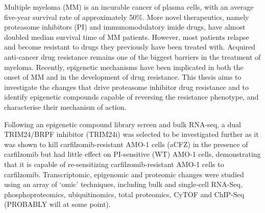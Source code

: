 
Multiple myeloma (MM) is an incurable cancer of plasma cells, with an average five-year survival rate of approximately 50\%.
More novel therapeutics, namely proteasome inhibitors (PI) and immunomodulatory imide drugs, have almost doubled median survival time of MM patients.
However, most patients relapse and become resistant to drugs they previously have been treated with.
Acquired anti-cancer drug resistance remains one of the biggest barriers in the treatment of myeloma.
Recently, epigenetic mechanisms have been implicated in both the onset of MM and in the development of drug resistance.
This thesis aims to investigate the changes that drive proteasome inhibitor drug resistance and to identify epigenetic compounds capable of reversing the resistance phenotype, and characterise their mechanism of action.

Following an epigenetic compound library screen and bulk RNA-seq, a dual TRIM24/BRPF inhibitor (TRIM24i) was selected to be investigated further as it was shown to kill carfilzomib-resistant AMO-1 cells (aCFZ) in the presence of carfilzomib but had little effect on PI-sensitive (WT) AMO-1 cells, demonstrating that it is capable of re-sensitizing carfilzomib-resistant AMO-1 cells to carfilzomib.
Transcriptomic, epigenomic and proteomic changes were studied using an array of `omic' techniques, including bulk and single-cell RNA-Seq, phosphoproteomics, ubiquitinomics, total proteomics, CyTOF and ChIP-Seq (PROBABLY will at some point).

